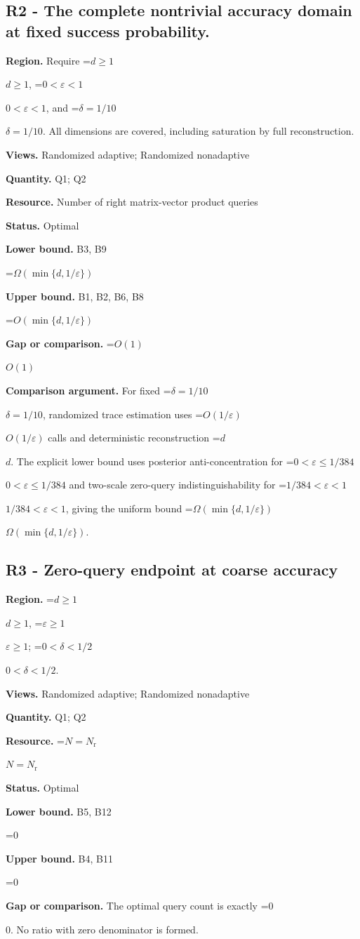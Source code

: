 \documentclass[10pt,a4paper]{article}
\newcommand{\AtlasMath}[1]{\par\begingroup\centering\setbox0=\hbox{$\displaystyle #1$}\ifdim\wd0>1.4\linewidth\typeout{ATLAS WIDE FORMULA: \the\wd0}\fi\ifdim\wd0>\linewidth\resizebox{\linewidth}{!}{\box0}\else\box0\fi\par\endgroup}
\newcommand{\AtlasInlineMath}[1]{\begingroup\setbox0=\hbox{$#1$}\ifdim\wd0>.4\linewidth\endgroup\AtlasMath{#1}\else\endgroup$#1$\fi}
\begin{document}
\subsection{R2 - The complete nontrivial accuracy domain at fixed success probability.}
\textbf{Region.} Require \AtlasInlineMath{d\ge1}, \AtlasInlineMath{0<\varepsilon<1}, and \AtlasInlineMath{\delta=1/10}. All dimensions are covered, including saturation by full reconstruction.

\textbf{Views.} Randomized adaptive; Randomized nonadaptive

\textbf{Quantity.} Q1; Q2

\textbf{Resource.} Number of right matrix-vector product queries

\textbf{Status.} Optimal

\textbf{Lower bound.} B3, B9

\AtlasMath{\Omega(\min\{d,1/\varepsilon\})}
\textbf{Upper bound.} B1, B2, B6, B8

\AtlasMath{O(\min\{d,1/\varepsilon\})}
\textbf{Gap or comparison.} \AtlasInlineMath{O(1)}

\textbf{Comparison argument.} For fixed \AtlasInlineMath{\delta=1/10}, randomized trace estimation uses \AtlasInlineMath{O(1/\varepsilon)} calls and deterministic reconstruction \AtlasInlineMath{d}. The explicit lower bound uses posterior anti-concentration for \AtlasInlineMath{0<\varepsilon\le1/384} and two-scale zero-query indistinguishability for \AtlasInlineMath{1/384<\varepsilon<1}, giving the uniform bound \AtlasInlineMath{\Omega(\min\{d,1/\varepsilon\})}.

\subsection{R3 - Zero-query endpoint at coarse accuracy}
\textbf{Region.} \AtlasInlineMath{d\ge1}, \AtlasInlineMath{\varepsilon\ge1}; \AtlasInlineMath{0<\delta<1/2}.

\textbf{Views.} Randomized adaptive; Randomized nonadaptive

\textbf{Quantity.} Q1; Q2

\textbf{Resource.} \AtlasInlineMath{N=N_{\mathrm{r}}}

\textbf{Status.} Optimal

\textbf{Lower bound.} B5, B12

\AtlasMath{0}
\textbf{Upper bound.} B4, B11

\AtlasMath{0}
\textbf{Gap or comparison.} The optimal query count is exactly \AtlasInlineMath{0}. No ratio with zero denominator is formed.
\end{document}
